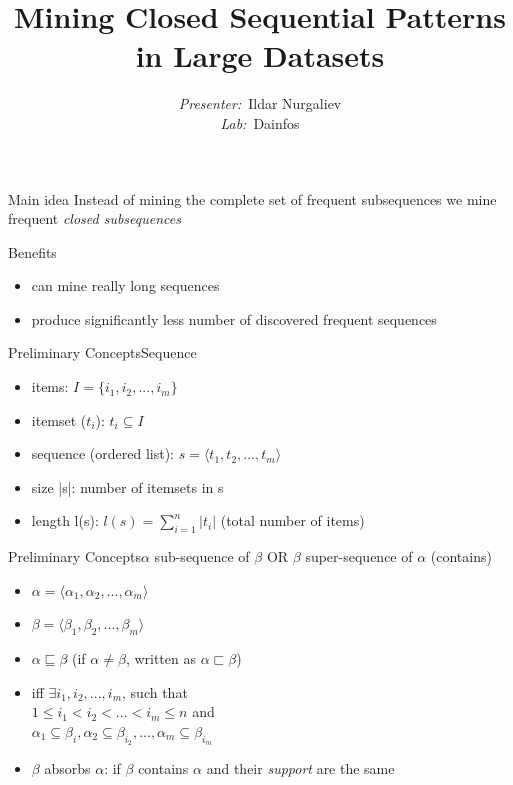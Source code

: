 \documentclass[12pt]{beamer}
\title{\fontsize{15}{15}\selectfont
	\textbf{Mining Closed Sequential Patterns in Large Datasets
}}
\author{
	\fontvi
	\small{%
\emph{Presenter:}~Ildar Nurgaliev\\%
\emph{Lab:}~Dainfos}\\%
}
\date{}
\begin{document}
\maketitle

\begin{frame}{Main idea}
  Instead of mining the complete set of frequent subsequences we mine frequent \textit{closed subsequences}
\end{frame}

\begin{frame}{Benefits}
\begin{itemize}
\item can mine really long sequences
\item produce significantly less number of discovered frequent sequences
\end{itemize}
\end{frame}

\begin{frame}{Preliminary Concepts}{Sequence}
\begin{itemize}
\item items: $\textit{I} = \{i_1, i_2, ..., i_m\}$
\item itemset ($t_i$): $t_i \subseteq \textit{I}$
\item sequence (ordered list): $s = \langle t_1, t_2, ..., t_m \rangle$
\item size |s|: number of itemsets in s
\item length l(s): $l(s)=\sum\limits_{i=1}^n |t_i|$ (total number of items)
\end{itemize}
\end{frame}

\begin{frame}{Preliminary Concepts}{$\alpha$ sub-sequence of $\beta$ OR $\beta$ super-sequence of $\alpha$ (contains)}
\begin{itemize}
\item $\alpha = \langle \alpha_1, \alpha_2, ..., \alpha_m \rangle$
\item $\beta = \langle \beta_1, \beta_2, ..., \beta_m \rangle$
\item $\alpha \sqsubseteq \beta$ (if $\alpha \neq \beta$, written as $\alpha \sqsubset \beta$)
\item iff $\exists i_1, i_2,...,i_m$, such that\\ $1 \leq i_1 < i_2 < ... < i_m \leq n$ and\\ $\alpha_1 \subseteq \beta_i,\alpha_2 \subseteq \beta_{i_2},...,\alpha_m \subseteq \beta_{i_m}$
\item $\beta$ absorbs $\alpha$: if $\beta$ contains $\alpha$ and their \textit{support} are the same
\end{itemize}
\end{frame}
\end{document}
